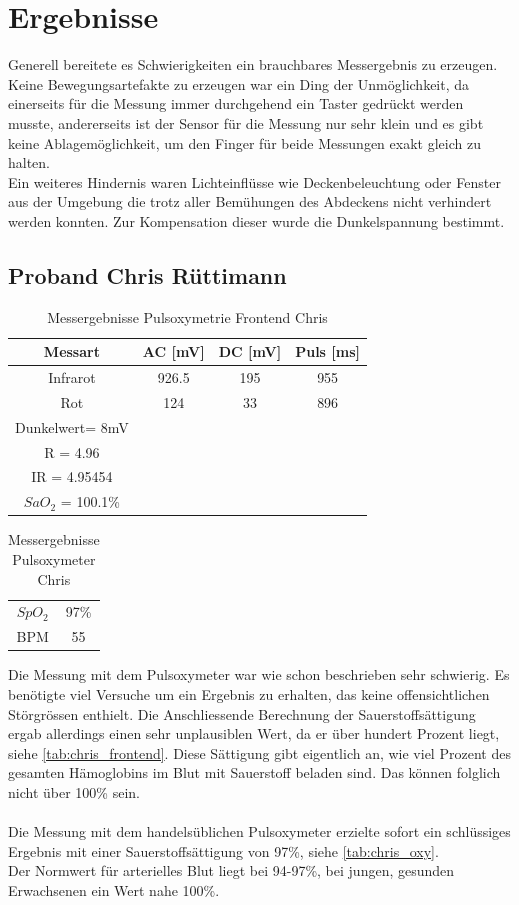 \documentclass[11pt]{scrartcl}
\begin{document}
    \section{Ergebnisse}
    Generell bereitete es Schwierigkeiten ein brauchbares Messergebnis zu erzeugen.
    Keine Bewegungsartefakte zu erzeugen war ein Ding der Unmöglichkeit, da einerseits für die Messung immer
    durchgehend ein Taster gedrückt werden musste, andererseits ist der Sensor für die Messung nur sehr klein und es
    gibt keine Ablagemöglichkeit, um den Finger für beide Messungen exakt gleich zu halten.\\
    Ein weiteres Hindernis waren Lichteinflüsse wie Deckenbeleuchtung oder Fenster aus der Umgebung die trotz aller
    Bemühungen des Abdeckens nicht verhindert werden konnten.
    Zur Kompensation dieser wurde die Dunkelspannung bestimmt.

    \subsection{Proband Chris Rüttimann}
    \begin {table} [h]
    \centering
    \caption{Messergebnisse Pulsoxymetrie Frontend Chris}
    \label{tab:chris_frontend}
    \begin{tabular}{c|c c c}
        Messart & AC [mV] & DC [mV] & Puls [ms] \\
        \hline
        Infrarot & 926.5 & 195 & 955 \\
        Rot & 124 & 33 & 896 \\
        \hline
        Dunkelwert= 8mV \\
        R = 4.96\\
        IR = 4.95454\\
        $SaO_{2}$ = 100.1\%
    \end{tabular}  
    \end{table}

    \begin {table} [h]
    \centering
    \caption{Messergebnisse Pulsoxymeter Chris}
    \label{tab:chris_oxy}
    \begin{tabular}{c|c}
        $SpO_{2}$ & 97\%  \\
        BPM & 55 
    \end{tabular}  
    \end{table}
    Die Messung mit dem Pulsoxymeter war wie schon beschrieben sehr schwierig.
    Es benötigte viel Versuche um ein Ergebnis zu erhalten, das keine offensichtlichen Störgrössen enthielt.
    Die Anschliessende Berechnung der Sauerstoffsättigung ergab allerdings einen sehr unplausiblen Wert, da er über
    hundert Prozent liegt, siehe \autoref{tab:chris_frontend}.
    Diese Sättigung gibt eigentlich an, wie viel Prozent des gesamten Hämoglobins im Blut mit Sauerstoff beladen sind.
    Das können folglich nicht über 100\% sein.\\\\
    Die Messung mit dem handelsüblichen Pulsoxymeter erzielte sofort ein schlüssiges Ergebnis mit einer
    Sauerstoffsättigung von 97\%, siehe \autoref{tab:chris_oxy}.\\
    Der Normwert für arterielles Blut liegt bei 94-97\%, bei jungen, gesunden Erwachsenen ein Wert nahe 100\%.
\end{document}
